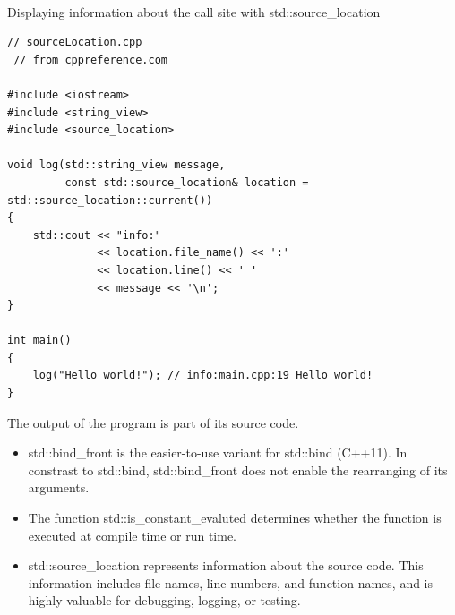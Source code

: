 \hspace*{\fill} \\ %
\noindent
Displaying information about the call site with std::source\_location
\begin{lstlisting}[style=styleCXX]
// sourceLocation.cpp
 // from cppreference.com

#include <iostream>
#include <string_view>
#include <source_location>

void log(std::string_view message,
		 const std::source_location& location = std::source_location::current())
{
	std::cout << "info:"
			  << location.file_name() << ':'
			  << location.line() << ' '
			  << message << '\n';
}

int main()
{
	log("Hello world!"); // info:main.cpp:19 Hello world!
}
\end{lstlisting}

The output of the program is part of its source code.

\begin{tcolorbox}[breakable,enhanced jigsaw,colback=mygreen!5!white,colframe=mygreen!75!black,title={Distilled Information}]

\begin{itemize}
\item 
std::bind\_front is the easier-to-use variant for std::bind (C++11). In constrast to std::bind, std::bind\_front does not enable the rearranging of its arguments.

\item 
The function std::is\_constant\_evaluted determines whether the function is executed at compile time or run time.

\item 
std::source\_location represents information about the source code. This information includes file names, line numbers, and function names, and is highly valuable for debugging, logging, or testing.
\end{itemize}

\end{tcolorbox}








